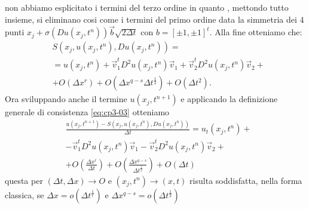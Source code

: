 non abbiamo esplicitato i termini del terzo ordine in quanto , mettondo tutto insieme, si eliminano cosi come i termini del primo ordine data la simmetria dei $4$ punti $x_j+\sigma(Du(x_j,t^n))\vec{b}\sqrt{2\Delta t}$ con $b=[\pm 1,\pm 1]^t$. Alla fine otteniamo che:
\begin{equation}
\label{eq:cp3-010}
\begin{split}
& S(x_j,u(x_j,t^n),Du(x_j,t^n)) = \\
& = u(x_j,t^n) + \vec{v}_1^tD^2u(x_j,t^n)\vec{v}_1 + \vec{v}_2^tD^2u(x_j,t^n)\vec{v}_2 + \\
& + O(\Delta x^r) + O(\Delta x^{q-s}\Delta t^{\frac{1}{2}}) + O(\Delta t^2).
\end{split}
\end{equation}
Ora sviluppando  anche il termine $u(x_j,t^{n+1})$ e applicando la definizione generale di consistenza \eqref{eq:cp3-03} otteniamo 
\[
\begin{split}
&\frac{u(x_j,t^{n+1})-S(x_j,u(x_j,t^n),Du(x_j,t^n))}{\Delta t}= u_t(x_j,t^n) + \\
&  -\vec{v}_1^tD^2u(x_j,t^n)\vec{v}_1 -\vec{v}_2^tD^2u(x_j,t^n)\vec{v}_2 + \\
& +O(\frac{\Delta x^r}{\Delta t}) + O(\frac{\Delta x^{q-s}}{\Delta t^{\frac{1}{2}}}) + O(\Delta t)
\end{split}
\]
questa per $(\Delta t,\Delta x)\to O$ e $(x_j,t^n)\to(x,t)$ risulta soddisfatta, nella forma classica, se $\Delta x = o(\Delta t^{\frac{1}{r}})$ e $\Delta x^{q-s}=o(\Delta t^{\frac{1}{2}})$
